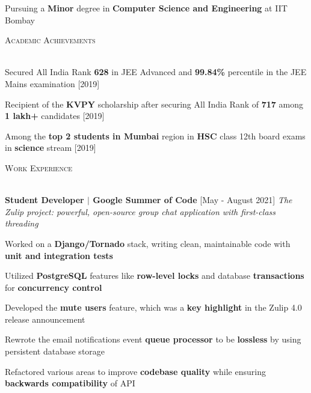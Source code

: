 \documentclass[11pt]{article}
\renewcommand{\section}[1]{
    \textsc{\Large{#1}}
    \vspace*{-10pt} \\ \hspace*{-5pt} 
    \hrulefill \\
    \vspace*{-15pt}
}
\newcommand{\smallbullet}{
    \tiny$\bullet$
}
\newenvironment{bullet-list-major}{
    \vspace*{-5pt}
    \begin{list}{
        \smallbullet
    }{
        \setlength\leftmargin{15pt}\topsep 0pt \itemsep -6pt
    }
} {
    \end{list}
}
\newcommand{\bigblock}[3]{
    {
        \vspace*{-5pt}
        \hspace*{-8pt} \textbf{#1} \hfill #2 \newline
        \textit{#3}
        \vspace*{-5pt}
    }
}
\newenvironment{bullet-list-minor}{
    \begin{list}{
        \smallbullet
    }{
        \setlength\leftmargin{15pt}\topsep 0pt \itemsep -6pt
    }
} {
    \end{list}
}
\begin{document}


    Pursuing a \textbf{Minor} degree in \textbf{Computer Science and Engineering} at IIT Bombay
    \vspace{-5pt}

    \section{Academic Achievements}
    \begin{bullet-list-major}
        \item Secured All India Rank \textbf{628} in JEE Advanced and \textbf{99.84\%} percentile in the JEE Mains examination \hfill [2019]
        \item Recipient of the \textbf{KVPY} scholarship after securing All India Rank of \textbf{717} among \textbf{1 lakh+} candidates \hfill [2019]
        \item Among the \textbf{top 2 students in Mumbai} region in \textbf{HSC} class 12th board exams in \textbf{science} stream   \hfill [2019]
    \end{bullet-list-major}


    \section{Work Experience}

    \bigblock{
        Student Developer \(|\) Google Summer of Code
    }{
        [May - August 2021]
    }{
        The Zulip project: powerful, open-source group chat application with first-class threading
    }
    \begin{bullet-list-minor}
        \item Worked on a \textbf{Django/Tornado} stack, writing clean, maintainable code with \textbf{unit and integration tests}
        \item Utilized \textbf{PostgreSQL} features like \textbf{row-level locks} and database \textbf{transactions} for \textbf{concurrency control}
        \item Developed the \textbf{mute users} feature, which was a \textbf{key highlight} in the Zulip 4.0 release announcement
        \item Rewrote the email notifications event \textbf{queue processor} to be \textbf{lossless} by using persistent database storage
        \item Refactored various areas to improve \textbf{codebase quality} while ensuring \textbf{backwards compatibility} of API
    \end{bullet-list-minor}
\end{document}
